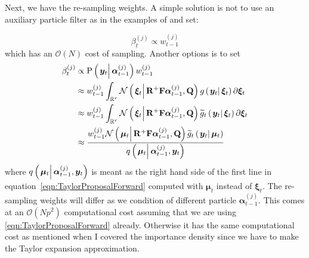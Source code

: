\documentclass[9pt, notitlepage]{article}
\renewcommand{\vec}[1]{\bm{#1}}
\newcommand{\mat}[1]{\mathbf{#1}}
\newcommand{\Lparen}[1]{\left( #1\right)}
\newcommand{\Cond}[2]{\left. #1 \vphantom{#2} \right\vert  #2}
\newcommand{\Prob}{\text{P}}
\newcommand{\optor}[2]{#1\Lparen{#2}}
\newcommand{\optorC}[3]{\optor{#1}{\Cond{#2}{#3}}}
\newcommand{\propC}[2]{\optorC{\Prob}{#1}{#2}}
\newcommand{\normalC}[3]{\optorC{\mathcal{N}}{#1}{#2,#3}}
\newcommand{\IDC}[2]{\optorC{q}{#1}{#2}}
\newcommand{\partic}[3]{#1_{#2}^{\Lparen{#3}}}
\newcommand{\bigO}[1]{\mathcal{O}\Lparen{#1}}
\newcommand{\dimState}{p}
\newcommand{\dimRng}{r}
\newcommand{\nPart}{N}
\begin{document}
Next, we have the re-sampling weights. A simple solution is not to use an auxiliary particle filter as in the examples of \cite{fearnhead10} and set:

\begin{equation}
	\partic{\beta}{t}{j} \propto \partic{w}{t-1}{j}
\end{equation}
%
which has an $\bigO{\nPart}$ cost of sampling. Another options is to set%
%
\begin{equation}\label{eqn:FWWeights}
\begin{split}
	\partic{\beta}{t}{j} &\propto  \propC{\vec{y}_t}{\partic{\vec{\alpha}}{t-1}{j}}\partic{w}{t-1}{j} \\
%
	& \approx \partic{w}{t-1}{j} \int_{\mathbb{R}^\dimRng}
		\normalC{\vec{\xi}_t}{\mat{R}^{+}\mat{F}\partic{\vec{\alpha}}{t-1}{j}}{\mat{Q}}
		\optorC{g}{\vec{y}_t}{\vec{\xi}_t}
		\partial \vec{\xi}_t \\
%
	& \approx \partic{w}{t-1}{j} \int_{\mathbb{R}^\dimRng}
		\normalC{\vec{\xi}_t}{\mat{R}^{+}\mat{F}\partic{\vec{\alpha}}{t-1}{j}}{\mat{Q}}
		\optorC{\widetilde{g}_t}{\vec{y}_t}{\vec{\xi}_t}
		\partial \vec{\xi}_t \\
%
	& \approx \frac{
		\partic{w}{t-1}{j}
		\normalC{\vec{\mu}_t}{\mat{R}^{+}\mat{F}\partic{\vec{\alpha}}{t-1}{j}}{\mat{Q}}
		\optorC{\widetilde{g}_t}{\vec{y}_t}{\vec{\mu}_t}
	}{ %
		\IDC{\vec{\mu}_t}{\partic{\vec{\alpha}}{t-1}{j}, \vec{y}_t}
	}
\end{split}
\end{equation}%
%
where $\IDC{\vec{\mu}_t}{\partic{\vec{\alpha}}{t-1}{j}, \vec{y}_t}$ is meant as the right hand side of the first line in equation~\eqref{eqn:TaylorProposalForward} computed with $\vec{\mu}_t$ instead of $\vec{\xi}_t$. The re-sampling weights will differ as we condition of different particle $\partic{\vec{\alpha}}{t-1}{j}$. This comes at an $\bigO{\nPart\dimState^2}$ computational cost assuming that we are using \eqref{eqn:TaylorProposalForward} already. Otherwise it has the same computational cost as mentioned when I covered the importance density since we have to make the Taylor expansion approximation.
\end{document}
